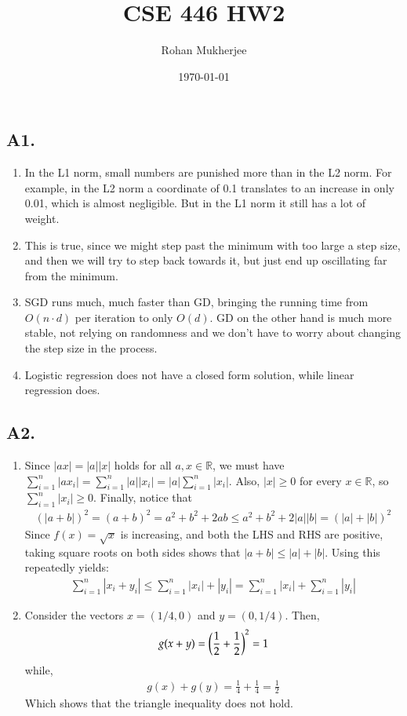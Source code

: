 \documentclass[12pt]{article}
\title{CSE 446 HW2}
\date{\today}
\author{Rohan Mukherjee}
\theoremstyle{definitionstyle}
\def\mbb#1{\mathbb{#1}}
\def \R{\mbb{R}}
\begin{document}
    \maketitle
    \subsection*{A1.}  
    \begin{enumerate}[label=\alph*.]
        \item In the L1 norm, small numbers are punished more than in the L2 norm. For example, in the L2 norm a coordinate of 0.1 translates to an increase in only 0.01, which is almost negligible. But in the L1 norm it still has a lot of weight.
        \item This is true, since we might step past the minimum with too large a step size, and then we will try to step back towards it, but just end up oscillating far from the minimum.
        \item SGD runs much, much faster than GD, bringing the running time from $O(n \cdot d)$ per iteration to only $O(d)$. GD on the other hand is much more stable, not relying on randomness and we don't have to worry about changing the step size in the process.
        \item Logistic regression does not have a closed form solution, while linear regression does.
    \end{enumerate}

    \subsection*{A2.}
    \begin{enumerate}[label=\alph*.]
        \item Since $|ax| = |a||x|$ holds for all $a,x \in \R$, we must have $\sum_{i=1}^n |ax_i| = \sum_{i=1}^n |a||x_i| = |a|\sum_{i=1}^n |x_i|$. Also, $|x| \geq 0$ for every $x \in \R$, so $\sum_{i=1}^n |x_i| \geq 0$. Finally, notice that
        \begin{align*}
            (|a+b|)^2 = (a+b)^2 = a^2+b^2+2ab \leq a^2+b^2+2|a||b| = (|a|+|b|)^2
        \end{align*}
        Since $f(x) = \sqrt{x}$ is increasing, and both the LHS and RHS are positive, taking square roots on both sides shows that $|a+b| \leq |a| + |b|$. Using this repeatedly yields:
        \begin{align*}
            \sum_{i=1}^n |x_i+y_i| \leq \sum_{i=1}^n |x_i| + |y_i| = \sum_{i=1}^n |x_i| + \sum_{i=1}^n |y_i|
        \end{align*}
        \item Consider the vectors $x = (1/4, 0)$ and $y = (0, 1/4)$. Then,
        \begin{align*}
            g(x+y) = \qty(\frac{1}{2} + \frac{1}{2})^2 = 1
        \end{align*}
        while,
        \begin{align*}
            g(x) + g(y) = \frac{1}{4} + \frac{1}{4} = \frac{1}{2}
        \end{align*}
        Which shows that the triangle inequality does not hold.
    \end{enumerate}
\end{document}
